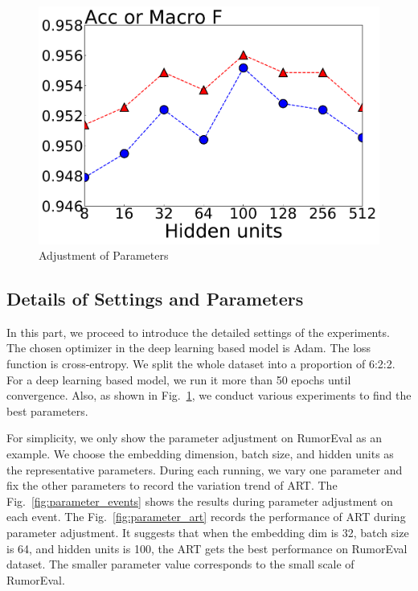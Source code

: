 \begin{figure}[tbp]
{\begin{minipage}[b]{0.35\linewidth}
			\includegraphics[width=1\linewidth]{fig/hidden_units}
		\end{minipage}
	}
	\caption{Adjustment of Parameters}
	\label{fig:parameter}
\end{figure}

\subsection{Details of Settings and Parameters}
In this part, we proceed to introduce the detailed settings of the experiments. The chosen optimizer in the deep learning based model is Adam. The loss function is cross-entropy. We split the whole dataset into a proportion of 6:2:2. For a deep learning based model, we  run it more than 50 epochs until convergence. Also, as shown in Fig.~\ref{fig:parameter}, we conduct various experiments to find the best parameters.

For simplicity, we only show the parameter adjustment on RumorEval as an example. We choose the embedding dimension, batch size, and hidden units as the representative parameters. During each running, we vary one parameter and fix the other parameters to record the variation trend of ART. The Fig.~\ref{fig:parameter_events} shows the results during parameter adjustment on each event. The Fig.~\ref{fig:parameter_art} records the performance of ART during parameter adjustment. It suggests that when the embedding dim is 32, batch size is 64, and hidden units is 100, the ART gets the best performance on RumorEval dataset. The smaller parameter value corresponds to the small scale of RumorEval.

